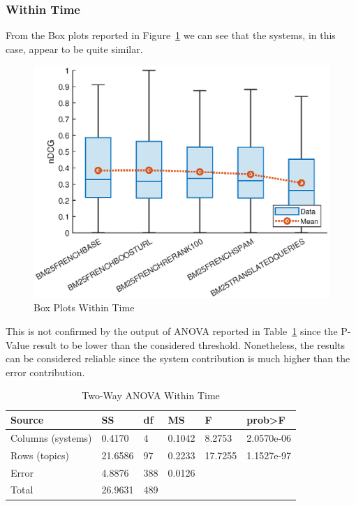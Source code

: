 \subsubsection{Within Time}
\label{subsubsec:wt}
From the Box plots reported in Figure~\ref{fig:WTBP} we can see that the systems, in this case, appear to be quite similar.
\begin{figure}[tb]
    \centering
    \includegraphics[scale=0.8]{figure/heldout/boxplot.eps}
    \caption{Box Plots Within Time}
    \label{fig:WTBP}
\end{figure}
This is not confirmed by the output of \ac{ANOVA} reported in Table~\ref{tab:WTANOVA} since the P-Value result to be lower than the considered threshold. Nonetheless, the results can be considered reliable since the system contribution is much higher than the error contribution.
\begin{table}[tb]
  \caption{Two-Way ANOVA Within Time}
  \label{tab:WTANOVA}
  \centering
  \begin{tabular}{|l|l|l|l|l|l|}
    \toprule
    Source & SS & df & MS & F & prob>F\\
    \midrule
    Columns (systems) & 0.4170 & 4 & 0.1042 & 8.2753 & 2.0570e-06\\
    Rows (topics) & 21.6586 & 97 & 0.2233 & 17.7255 & 1.1527e-97\\
    Error & 4.8876 & 388 & 0.0126 &  & \\
    Total & 26.9631 & 489 &  &  & \\
  \bottomrule
\end{tabular}
\end{table}
